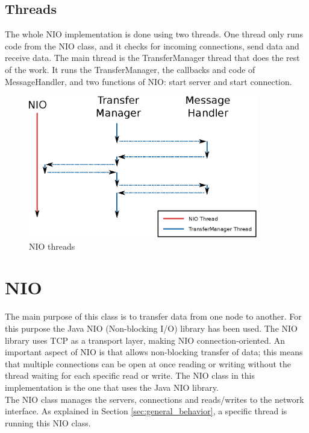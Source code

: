 \documentclass[11pt]{article}
\begin{document}
	\subsection{Threads}
	The whole NIO implementation is done using two threads. One thread only runs code from the NIO class, and it checks for incoming connections, send data and receive data. The main thread is the TransferManager thread that does the rest of the work. It runs the TransferManager, the callbacks and code of MessageHandler, and two functions of NIO: start server and start connection.
		\begin{figure}[H]
		\centering
		\includegraphics[width=100mm]{img/drawing2.eps}
		\caption[NIO threads]{NIO threads}
		\label{drawing2}
\end{figure}
		
		
\section{NIO}
	The main purpose of this class is to transfer data from one node to another. For this purpose the Java NIO (Non-blocking I/O) library has been used. The NIO library uses TCP as a transport layer, making NIO connection-oriented. An important aspect of NIO is that allows non-blocking transfer of data; this means that multiple connections can be open at once reading or writing without the thread waiting for each specific read or write. The NIO class in this implementation is the one that uses the Java NIO library.\\
	The NIO class manages the servers, connections and reads/writes to the network interface. As explained in Section \ref{sec:general_behavior}, a specific thread is running this NIO class.
	
\end{document}
